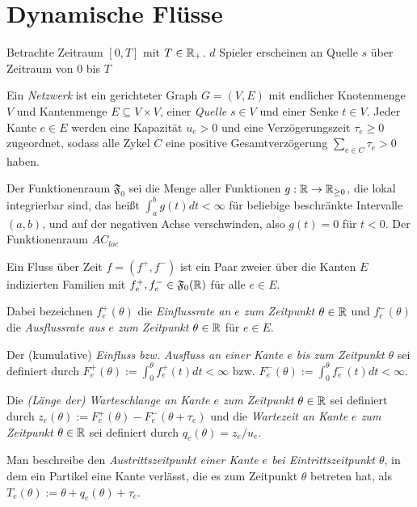 \section{Dynamische Flüsse}

Betrachte Zeitraum $[0,T]$ mit $T\in\mathbb{R}_+$.
$d$ Spieler erscheinen an Quelle $s$ über Zeitraum von $0$ bis $T$

\begin{definition}[Netzwerk]
	Ein \emph{Netzwerk} ist ein gerichteter Graph $G=(V,E)$ mit endlicher Knotenmenge $V$ und Kantenmenge $E\subseteq V\times V$, einer \emph{Quelle} $s\in V$ und einer Senke $t\in V$.
	Jeder Kante $e\in E$ werden eine Kapazität $u_e > 0$ und eine Verzögerungszeit $\tau_e\geq 0$ zugeordnet, sodass alle Zykel $C$ eine positive Gesamtverzögerung $\sum_{e\in C}\tau_e > 0$ haben.
\end{definition}


\begin{definition}
	Der Funktionenraum $\mathfrak{F}_0$ sei die Menge aller Funktionen $g: \mathbb{R} \to \mathbb{R}_{\geq 0}$, die lokal integrierbar sind, das heißt $\int_a^b g(t) dt< \infty$ für beliebige beschränkte Intervalle $(a,b)$, und auf der negativen Achse verschwinden, also $g(t)=0$ für $t<0$.
	Der Funktionenraum $AC_{loc}$
\end{definition}

\begin{definition}
	Ein Fluss über Zeit $f=(f^+, f^-)$ ist ein Paar zweier über die Kanten $E$ indizierten Familien mit $f^+_e,f^-_e\in\mathfrak F_0(\mathbb{R})$ für alle $e\in E$.
	
	Dabei bezeichnen $f_e^+(\theta)$ die \emph{Einflussrate an $e$ zum Zeitpunkt $\theta\in\mathbb{R}$} und $f_e^-(\theta)$ die \emph{Ausflussrate aus $e$ zum Zeitpunkt $\theta\in\mathbb{R}$} für $e\in E$.
	
	Der (kumulative) \emph{Einfluss bzw. Ausfluss an einer Kante $e$ bis zum Zeitpunkt $\theta$} sei definiert durch $F^+_e(\theta):=\int_0^\theta f^+_e(t) dt<\infty$ bzw. $F^-_e(\theta):=\int_0^\theta f^-_e(t) dt<\infty$.
	
	Die \emph{(Länge der) Warteschlange an Kante $e$ zum Zeitpunkt $\theta\in\mathbb{R}$} sei definiert durch $z_e(\theta):= F_e^+(\theta) - F_e^-(\theta + \tau_e)$ und die \emph{Wartezeit an Kante $e$ zum Zeitpunkt $\theta\in\mathbb{R}$} sei definiert durch $q_e(\theta) = z_e / u_e$.
	
	Man beschreibe den \emph{Austrittszeitpunkt einer Kante $e$ bei Eintrittszeitpunkt $\theta$}, in dem ein Partikel eine Kante verlässt, die es zum Zeitpunkt $\theta$ betreten hat, als $T_e(\theta):=\theta + q_e(\theta) + \tau_e$.
\end{definition}

